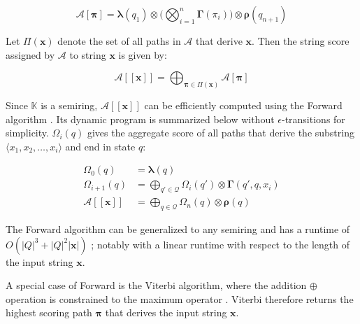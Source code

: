 \begin{equation}
  \mathcal{A}[\bm{\pi}] = \bm{\lambda}(q_1) \otimes \Bigg( \bigotimes_{i=1}^n \bm{\Gamma}(\pi_i) \Bigg) \otimes \bm{\rho}(q_{n+1})
\end{equation}

\begin{definition}
  \label{def:string_score}
  Let $\Pi(\bm{x})$ denote the set of all paths in $\mathcal{A}$ that derive
  $\bm{x}$. Then the string score assigned by $\mathcal{A}$ to string $\bm{x}$
  is given by:
  
\end{definition}

\begin{equation}
  \mathcal{A}[\![\bm{x}]\!] = \bigoplus_{\bm{\pi} \in \Pi(\bm{x})} \mathcal{A}[\bm{\pi}]
\end{equation}

\begin{remark}
  Since $\mathbb{K}$ is a semiring, $\mathcal{A}[\![\bm{x}]\!]$ can be
  efficiently computed using the Forward algorithm \citep{baum1966statistical}.
  Its dynamic program is summarized below without $\epsilon$-transitions for
  simplicity. $\Omega_i(q)$ gives the aggregate score of all paths that derive
  the substring $\langle x_1, x_2, \dots, x_i \rangle$ and end in state $q$:
 
  \begin{subequations}
    \begin{align}
      \Omega_0(q) &= \bm{\lambda}(q) \\
      \Omega_{i+1}(q) &= \bigoplus_{q' \in \mathcal{Q}} \Omega_i(q') \otimes \bm{\Gamma}(q',q,x_i)  \\
      \mathcal{A}[\![\bm{x}]\!] &= \bigoplus_{q \in \mathcal{Q}} \Omega_n(q) \otimes \bm{\rho}(q)
    \end{align}
  \end{subequations}

\end{remark}

\begin{remark}
  \label{rmk:old_runtime}
  The Forward algorithm can be generalized to any semiring
  \citep{eisner2002parameter} and has a runtime of $O(|Q|^3 + |Q|^2|\bm{x}|)$
  \citep{schwartz2018sopa}; notably with a linear runtime with respect to the
  length of the input string $\bm{x}$.
\end{remark}

\begin{remark}
  A special case of Forward is the Viterbi algorithm, where the addition
  $\oplus$ operation is constrained to the maximum operator
  \citep{viterbi1967error}. Viterbi therefore returns the highest scoring path
  $\bm{\pi}$ that derives the input string $\bm{x}$.
\end{remark}

